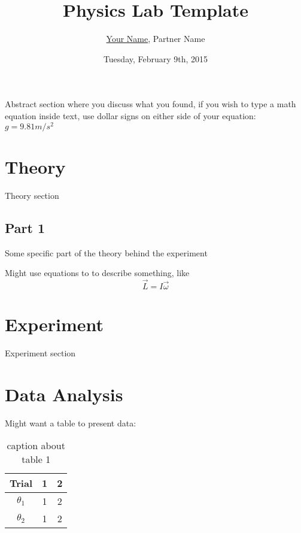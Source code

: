 \documentclass[11pt, oneside]{article}   	%
\title{Physics Lab Template}
\author{\underline{Your Name}, Partner Name}
\date{Tuesday, February 9th, 2015}
\begin{document}
\maketitle %


\abstract %
Abstract section where you discuss what you found, if you wish to type a math equation inside text, use dollar signs on either side of your equation: $g = 9.81m/s^2$




\section{Theory}
Theory section

\subsection{Part 1}
Some specific part of the theory behind the experiment
\newline %

\par Might use equations to to describe something, like %
\begin{equation} \vec{L} = I \vec{\omega} \end{equation}


\section{Experiment}
Experiment section



\section{Data Analysis}
Might want a table to present data:

\begin{table}[h]
\centering
\begin{tabular}{|c|c|c|}
	\hline
	Trial & 1 & 2  \\ \hline
	$\theta_1$ & 1 & 2 \\ \hline
	$\theta_2$ & 1 & 2 \\ \hline
	\end{tabular}
	\caption{caption about table 1}
	\label{Table 1}
\end{table}
\end{document}
